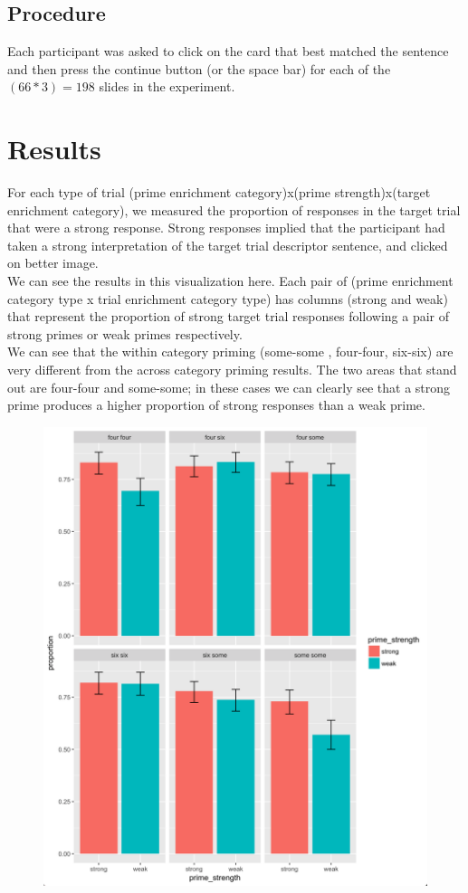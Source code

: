 \documentclass[]{article}
\begin{document}
\subsection*{Procedure}
Each participant was asked to click on the card that best matched the sentence and then press the continue button (or the space bar) for each of the $(66*3) = 198$ slides in the experiment.

\pagebreak
\section*{Results}
For each type of trial (prime enrichment category)x(prime strength)x(target enrichment category), we measured the proportion of responses in the target trial that were a strong response. Strong responses implied that the participant had taken a strong interpretation of the target trial descriptor sentence, and clicked on better image.\\

We can see the results in this visualization here. Each pair of (prime enrichment category type x trial enrichment category type) has  columns (strong and weak) that represent the proportion of strong target trial responses following a pair of strong primes or weak primes respectively.\\

We can see that the within category priming (some-some , four-four, six-six) are very different from the across category priming results. The two areas that stand out are four-four and some-some; in these cases we can clearly see that a strong prime produces a higher proportion of strong responses than a weak prime.

\begin{figure}[h]
\centering
\includegraphics[scale=0.3]{results.png} 
\end{figure}
\end{document}
